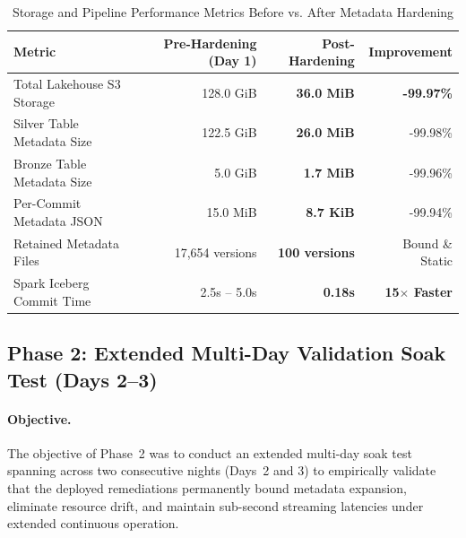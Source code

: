 \begin{table}[htbp]
\centering
\small
\caption{Storage and Pipeline Performance Metrics Before vs. After Metadata Hardening}
\label{tab:pipeline_remediation}
\vspace{0.2cm}
\begin{tabular}{l r r r}
\toprule
\textbf{Metric} & \textbf{Pre-Hardening (Day 1)} & \textbf{Post-Hardening} & \textbf{Improvement} \\
\midrule
Total Lakehouse S3 Storage & 128.0 GiB & \textbf{36.0 MiB} & \textbf{-99.97\%} \\
Silver Table Metadata Size & 122.5 GiB & \textbf{26.0 MiB} & -99.98\% \\
Bronze Table Metadata Size &   5.0 GiB &  \textbf{1.7 MiB} & -99.96\% \\
Per-Commit Metadata JSON   &  15.0 MiB &  \textbf{8.7 KiB} & -99.94\% \\
Retained Metadata Files    & 17,654 versions & \textbf{100 versions} & Bound \& Static \\
Spark Iceberg Commit Time  & 2.5s -- 5.0s & \textbf{0.18s} & \textbf{15$\times$ Faster} \\
\bottomrule
\end{tabular}
\end{table}

\subsection{Phase 2: Extended Multi-Day Validation Soak Test (Days 2--3)}
\label{subsec:eval_phase2}

\paragraph{Objective.}
The objective of Phase~2 was to conduct an extended multi-day soak test spanning across two consecutive nights (Days~2 and 3) to empirically validate that the deployed remediations permanently bound metadata expansion, eliminate resource drift, and maintain sub-second streaming latencies under extended continuous operation.

